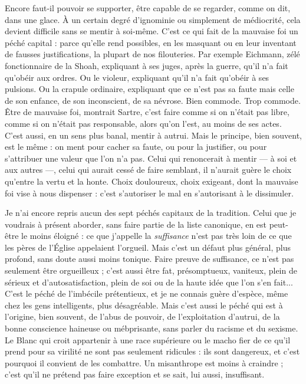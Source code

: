 Encore faut-il pouvoir se supporter, être capable de se regarder, comme on
dit, dans une glace. À un certain degré d’ignominie ou simplement de médiocrité,
cela devient difficile sans se mentir à soi-même. C’est ce qui fait de la
mauvaise foi un péché capital : parce qu’elle rend possibles, en les masquant ou
en leur inventant de fausses justifications, la plupart de nos filouteries. Par
exemple Eichmann, zélé fonctionnaire de la Shoah, expliquant à ses juges,
après la guerre, qu’il n’a fait qu’obéir aux ordres. Ou le violeur, expliquant qu’il
n’a fait qu’obéir à ses pulsions. Ou la crapule ordinaire, expliquant que ce n’est
pas sa faute mais celle de son enfance, de son inconscient, de sa névrose. Bien
commode. Trop commode. Être de mauvaise foi, montrait Sartre, c’est faire
comme si on n'était pas libre, comme si on n’était pas responsable, alors qu’on
l’est, au moins de ses actes. C’est aussi, en un sens plus banal, mentir à autrui.
Mais le principe, bien souvent, est le même : on ment pour cacher sa faute, ou
pour la justifier, ou pour s’attribuer une valeur que l’on n’a pas. Celui qui
renoncerait à mentir — à soi et aux autres —, celui qui aurait cessé de faire semblant,
il n’aurait guère le choix qu’entre la vertu et la honte. Choix douloureux,
choix exigeant, dont la mauvaise foi vise à nous dispenser : c’est s’autoriser le
mal en s’autorisant à le dissimuler.

Je n’ai encore repris aucun des sept péchés capitaux de la tradition. Celui
que je voudrais à présent aborder, sans faire partie de la liste canonique, en est
peut-être le moins éloigné : ce que j'appelle la {\it suffisance} n’est pas très loin de ce
que les pères de l’Église appelaient l’orgueil. Mais c’est un défaut plus général,
plus profond, sans doute aussi moins tonique. Faire preuve de suffisance, ce
n’est pas seulement être orgueilleux ; c’est aussi être fat, présomptueux, vaniteux,
plein de sérieux et d’autosatisfaction, plein de soi ou de la haute idée que
l’on s’en fait... C’est le péché de l’imbécile prétentieux, et je ne connais guère
d'espèce, même chez les gens intelligents, plus désagréable. Mais c’est aussi le
péché qui est à l’origine, bien souvent, de l’abus de pouvoir, de l'exploitation
d'autrui, de la bonne conscience haineuse ou mébprisante, sans parler du
racisme et du sexisme. Le Blanc qui croit appartenir à une race supérieure ou le
macho fier de ce qu’il prend pour sa virilité ne sont pas seulement ridicules : ils
sont dangereux, et c’est pourquoi il convient de les combattre. Un misanthrope
est moins à craindre ; c’est qu’il ne prétend pas faire exception et se sait, lui
aussi, insuffisant.

